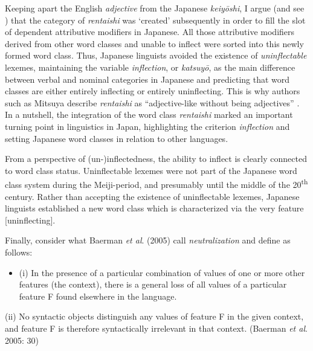 \documentclass[output=paper]{langscibook}
\begin{document}
 Keeping apart the English \textit{adjective} from the Japanese \textit{keiyōshi}, I argue (and see \citealt{Kim2006}) that the category of \textit{rentaishi} was ‘created’ subsequently in order to fill the slot of dependent attributive modifiers in Japanese. All those attributive modifiers derived from other word classes and unable to inflect were sorted into this newly formed word class. Thus, Japanese linguists avoided the existence of \textit{uninflectable} lexemes, maintaining the variable \textit{inflection}, or \textit{katsuyō}, as the main difference between verbal and nominal categories in Japanese and predicting that word classes are either entirely inflecting or entirely uninflecting. This is why authors such as Mitsuya describe \textit{rentaishi} as “adjective-like without being adjectives” \citep[238]{Mitsuya1932}. In a nutshell, the integration of the word class \textit{rentaishi} marked an important turning point in linguistics in Japan, highlighting the criterion \textit{inflection} and setting Japanese word classes in relation to other languages.

From a perspective of (un-)inflectedness, the ability to inflect is clearly connected to word class status. Uninflectable lexemes were not part of the Japanese word class system during the Meiji-period, and presumably until the middle of the 20\textsuperscript{th} century. Rather than accepting the existence of uninflectable lexemes, Japanese linguists established a new word class which is characterized via the very feature [uninflecting].

Finally, consider what Baerman \textit{et al}. (2005) call \textit{neutralization} and define as follows:

\begin{itemize}
\item \begin{styleBeispielCinqueKapitel}
(i) In the presence of a particular combination of values of one or more other features (the context), there is a general loss of all values of a particular feature F found elsewhere in the language.
\end{styleBeispielCinqueKapitel}
\end{itemize}
\begin{styleBeispielCinqueKapitel}
(ii) No syntactic objects distinguish any values of feature F in the given context, and feature F is therefore syntactically irrelevant in that context. (Baerman \textit{et al}. 2005: 30)
\end{styleBeispielCinqueKapitel}
\end{document}
